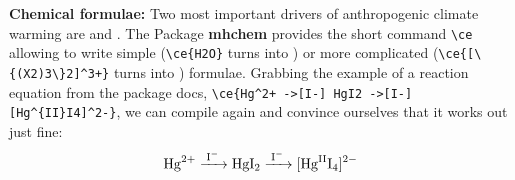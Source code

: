 \textbf{Chemical formulae:} Two most important drivers of anthropogenic climate warming are  and .
The Package \textbf{mhchem} provides the short command \Verb+\ce+ allowing to write simple (\Verb+\ce{H2O}+ turns into ) or more complicated (\Verb|\ce{[\{(X2)3\}2]^3+}| turns into ) formulae. Grabbing the example of a reaction equation from the package docs, \Verb?\ce{Hg^2+ ->[I-] HgI2 ->[I-] [Hg^{II}I4]^2-}?, we can compile again and convince ourselves that it works out just fine:
\begin{equation}
\ce{Hg^2+ ->[I-] HgI2 ->[I-] [Hg^{II}I4]^2-}
\end{equation}





